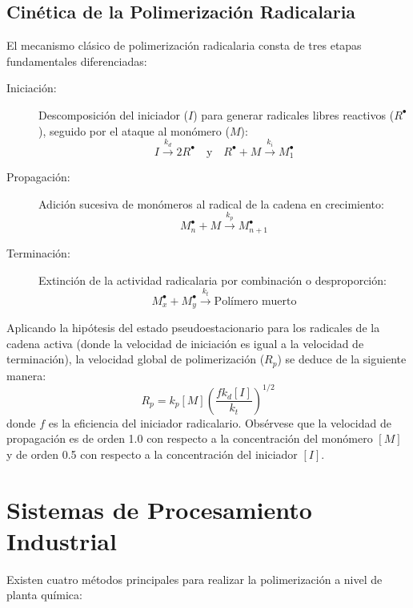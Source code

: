 \subsection{Cinética de la Polimerización Radicalaria}
El mecanismo clásico de polimerización radicalaria consta de tres etapas fundamentales diferenciadas:

\begin{description}
    \item[Iniciación:] Descomposición del iniciador ($I$) para generar radicales libres reactivos ($R^\bullet$), seguido por el ataque al monómero ($M$):
        \begin{equation}
            I \xrightarrow{k_d} 2 R^\bullet \quad \text{y} \quad R^\bullet + M \xrightarrow{k_i} M_1^\bullet
        \end{equation}
    \item[Propagación:] Adición sucesiva de monómeros al radical de la cadena en crecimiento:
        \begin{equation}
            M_n^\bullet + M \xrightarrow{k_p} M_{n+1}^\bullet
        \end{equation}
    \item[Terminación:] Extinción de la actividad radicalaria por combinación o desproporción:
        \begin{equation}
            M_x^\bullet + M_y^\bullet \xrightarrow{k_t} \text{Polímero muerto}
        \end{equation}
\end{description}

Aplicando la hipótesis del estado pseudoestacionario para los radicales de la cadena activa (donde la velocidad de iniciación es igual a la velocidad de terminación), la velocidad global de polimerización ($R_p$) se deduce de la siguiente manera:
\begin{equation}
    R_p = k_p [M] \left( \frac{f k_d [I]}{k_t} \right)^{1/2}
    \label{eq:velocidad_rp}
\end{equation}
donde $f$ es la eficiencia del iniciador radicalario. Obsérvese que la velocidad de propagación es de orden 1.0 con respecto a la concentración del monómero $[M]$ y de orden 0.5 con respecto a la concentración del iniciador $[I]$.

\section{Sistemas de Procesamiento Industrial}

Existen cuatro métodos principales para realizar la polimerización a nivel de planta química:

